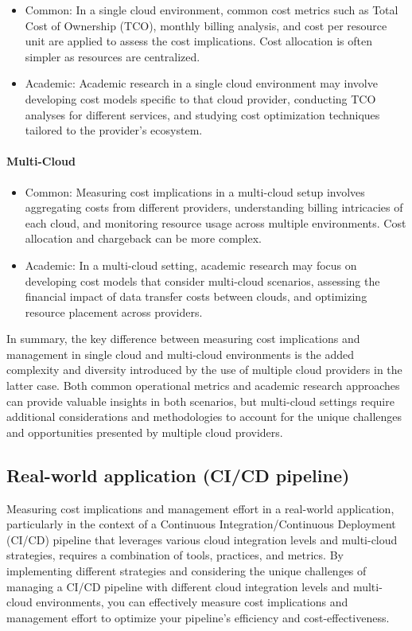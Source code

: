 \begin{itemize}
    \item Common: In a single cloud environment, common cost metrics such as Total Cost of Ownership (TCO), monthly billing analysis, 
    and cost per resource unit are applied to assess the cost implications. Cost allocation is often simpler as resources are centralized.
    \item Academic: Academic research in a single cloud environment may involve developing cost models specific to that cloud provider,
    conducting TCO analyses for different services, and studying cost optimization techniques tailored to the provider's ecosystem.

\end{itemize}
\paragraph{Multi-Cloud}
\begin{itemize}
    \item Common: Measuring cost implications in a multi-cloud setup involves aggregating costs from different providers, 
    understanding billing intricacies of each cloud, and monitoring resource usage across multiple environments. 
    Cost allocation and chargeback can be more complex.
    \item Academic: In a multi-cloud setting, academic research may focus on developing cost models that consider multi-cloud scenarios, 
    assessing the financial impact of data transfer costs between clouds, and optimizing resource placement across providers.
\end{itemize}



In summary, the key difference between measuring cost implications and management in single cloud and multi-cloud environments is the added complexity 
and diversity introduced by the use of multiple cloud providers in the latter case. 
Both common operational metrics and academic research approaches can provide valuable insights in both scenarios, 
but multi-cloud settings require additional considerations and methodologies to account for the unique challenges and opportunities presented by multiple cloud providers.

\subsection{Real-world application (CI/CD pipeline)}

Measuring cost implications and management effort in a real-world application, 
particularly in the context of a Continuous Integration/Continuous Deployment (CI/CD) pipeline 
that leverages various cloud integration levels and multi-cloud strategies, 
requires a combination of tools, practices, and metrics.
By implementing different strategies and considering the unique challenges of managing a CI/CD pipeline with different cloud integration levels 
and multi-cloud environments, you can effectively measure cost implications and management effort to optimize your pipeline's efficiency and cost-effectiveness.
